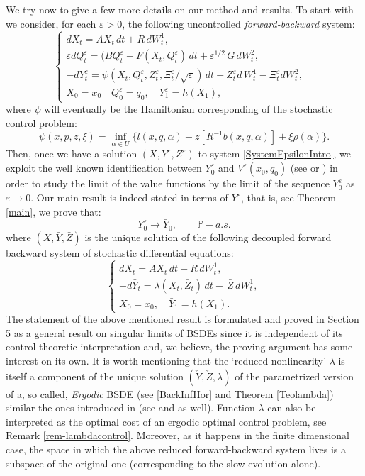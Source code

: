 \documentclass[reqno,a4paper,11 pt]{article}
\def \e {\varepsilon}
\numberwithin{equation}{section}
\begin{document}
\medskip 

 

We try now to give a few more details on our method and results. To start with  we consider,
 for each $\e >0$, the following uncontrolled {\em forward-backward} system:
\begin{equation}\label{SystemEpsilonIntro}
\begin{cases}
dX_t= AX_t  \, dt + R  \, dW^1_t, & \\ 
 \e dQ^\e_t= (BQ^\e_t+ F(X_t,Q^\e_t) \,dt + \e^{1/2}  \,G \, dW^2_t, &  \\ 
- dY^{\e}_t  =  \psi(X_t,Q^\e_t,Z^\e_t, \Xi^\e_t / \sqrt{\e}) \,dt - Z^\e _t d\, W^1_t  - \Xi^\e_t dW_t^2, \\ 
X_0= x_0 \quad Q^\e_0=q_0, \quad {Y}^\e_1=h(X_1),
\end{cases} 
\end{equation}
where $\psi$ will eventually be the Hamiltonian corresponding of the stochastic control problem:  $$\psi(x,p,z,\xi)=\inf_{\alpha \in U} \{l(x,q,\alpha)+ z[R^{-1}b(x,q,\alpha)] + \xi \rho(\alpha) \}. $$
Then, once we have a solution $(X,Y^\e,Z^\e )$ to system \eqref{SystemEpsilonIntro}, we exploit the well known identification between $Y^\e_0$ and $V^{\e}(x_0,q_0)$
(see \cite{ElKPeQu} or \cite{FuTes})  in order to study the limit of the value functions by the limit of the sequence $Y^\e_0$ as $\e \rightarrow 0$.
 Our main result is indeed stated in terms of $Y^\e$, that is, see Theorem \ref{main}, we  prove that:
$$Y^\e_0\rightarrow \bar Y_0, \qquad \mathbb{P} -a.s.$$
where $(X,\bar Y,\bar Z)$ is the unique solution of the following decoupled forward backward system of stochastic differential equations:
$$
\begin{cases}
d X_t =   AX_t \, dt + R\, d W^1 _t, \\
-d\bar{Y}_t  = \lambda({X}_t,\bar{Z}_t)\,dt - \, \bar{Z}\, dW^1_t,   \\
X_0= x_0, \quad \bar{Y}_1=h(X_1).
\end{cases} 
$$
The statement of the above mentioned result is formulated and proved in Section 5 as a general result on singular limits of  BSDEs since it is independent of its control theoretic interpretation and, we believe, the proving argument has some interest on its own.
It is worth mentioning
 that the `reduced nonlinearity' $\lambda$ is itself a component of the unique solution $(\check{Y}, \check{Z}, \lambda)$ of the parametrized version of a, so called,  \textit{Ergodic} BSDE (see \eqref{BackInfHor} and Theorem \ref{Teolambda}) similar the ones  introduced in \cite{FuHuTes} (see \cite{DebHuTess} and \cite{HuRichou} as well). Function $\lambda$  can also be interpreted as  the optimal cost of an ergodic optimal control problem, see Remark \ref{rem-lambdacontrol}. Moreover, as it happens in  the finite dimensional case, the space in which the above reduced forward-backward system lives is a subspace of the original one (corresponding to the slow evolution alone).
 
\end{document}
